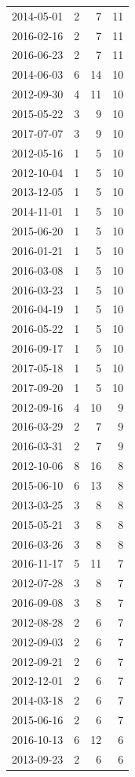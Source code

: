 \begin{tabular}{lrrr}
2014-05-01 & 2 & 7 & 11 \\
2016-02-16 & 2 & 7 & 11 \\
2016-06-23 & 2 & 7 & 11 \\
2014-06-03 & 6 & 14 & 10 \\
2012-09-30 & 4 & 11 & 10 \\
2015-05-22 & 3 & 9 & 10 \\
2017-07-07 & 3 & 9 & 10 \\
2012-05-16 & 1 & 5 & 10 \\
2012-10-04 & 1 & 5 & 10 \\
2013-12-05 & 1 & 5 & 10 \\
2014-11-01 & 1 & 5 & 10 \\
2015-06-20 & 1 & 5 & 10 \\
2016-01-21 & 1 & 5 & 10 \\
2016-03-08 & 1 & 5 & 10 \\
2016-03-23 & 1 & 5 & 10 \\
2016-04-19 & 1 & 5 & 10 \\
2016-05-22 & 1 & 5 & 10 \\
2016-09-17 & 1 & 5 & 10 \\
2017-05-18 & 1 & 5 & 10 \\
2017-09-20 & 1 & 5 & 10 \\
2012-09-16 & 4 & 10 & 9 \\
2016-03-29 & 2 & 7 & 9 \\
2016-03-31 & 2 & 7 & 9 \\
2012-10-06 & 8 & 16 & 8 \\
2015-06-10 & 6 & 13 & 8 \\
2013-03-25 & 3 & 8 & 8 \\
2015-05-21 & 3 & 8 & 8 \\
2016-03-26 & 3 & 8 & 8 \\
2016-11-17 & 5 & 11 & 7 \\
2012-07-28 & 3 & 8 & 7 \\
2016-09-08 & 3 & 8 & 7 \\
2012-08-28 & 2 & 6 & 7 \\
2012-09-03 & 2 & 6 & 7 \\
2012-09-21 & 2 & 6 & 7 \\
2012-12-01 & 2 & 6 & 7 \\
2014-03-18 & 2 & 6 & 7 \\
2015-06-16 & 2 & 6 & 7 \\
2016-10-13 & 6 & 12 & 6 \\
2013-09-23 & 2 & 6 & 6 \\

\end{tabular}
